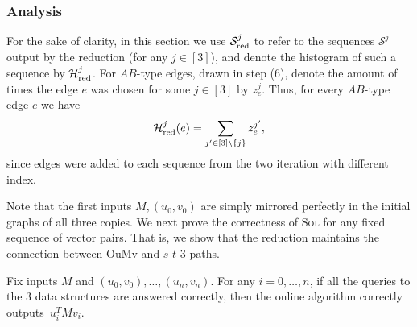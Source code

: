 \documentclass[letter,11pt]{article}
\newcommand{\oumv}{\textnormal{\textsf{OuMv}}\xspace}
\newcommand{\paths}[3]{${#1}$-${#2}$ ${#3}$-paths\xspace}
\newcommand{\sol}{\textsc{Sol}\xspace}
\newcommand{\redseq}{\mathcal{S}_\textnormal{red}}
\newcommand{\redhist}{\mathcal{H}_\textnormal{red}}
\begin{document}
\subsubsection{Analysis}

For the sake of clarity, in this section we use $\redseq^j$ to refer to the sequences $\mathcal{S}^j$  output by the reduction (for any $j\in[3]$), and denote the histogram of such a sequence by $\redhist^j$.
For $AB$-type edges, drawn in step (6), denote the amount of times the edge $e$ was chosen for some $j\in[3]$ by $z_e^j$. 
Thus, for every $AB$-type edge $e$ we have 
\[
    \redhist^j(e) = \sum_{j' \in [3]\setminus \set{j}} z_e^{j'} ,
\]
since edges were added to each sequence from the two iteration with different index.

Note that the first inputs $M, (u_0, v_0)$ are simply mirrored perfectly in the initial graphs of all three copies.
We next prove the correctness of \sol for any fixed sequence of vector pairs. That is, we show that the reduction maintains the connection between \oumv and \paths st3.

\begin{claim}
    \label{claim:correctness_fixed}
    Fix inputs $M$ and $(u_0, v_0), \dots, (u_n, v_n)$.
    For any $i = 0, \dots, n$, 
    if all the queries to the $3$ data structures are answered correctly,
    then the online algorithm correctly outputs~$u_i^T M v_i$.
\end{claim}
 
\end{document}
